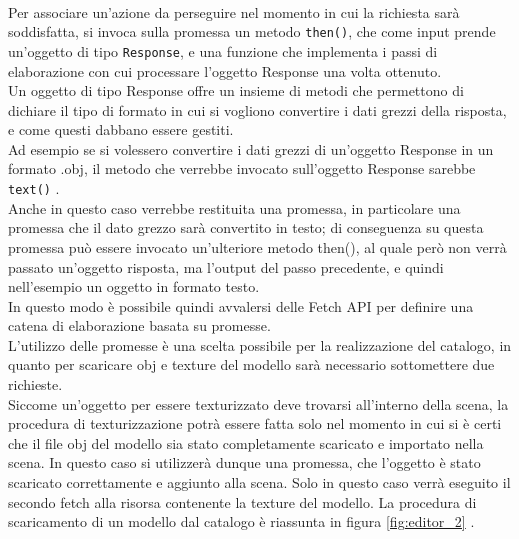 \\ 
Per associare un’azione da perseguire nel momento in cui la richiesta sarà soddisfatta, si invoca sulla promessa un metodo \texttt{then()}, che come input prende un’oggetto di tipo \texttt{Response}, e una funzione che implementa i passi di elaborazione con cui processare l’oggetto Response una volta ottenuto.
\\
Un oggetto di tipo Response offre un insieme di metodi che permettono di dichiare il tipo di formato in cui si vogliono convertire i dati grezzi della risposta, e come questi dabbano essere gestiti.
\\
Ad esempio se si volessero convertire i dati grezzi di un’oggetto Response in un formato .obj, il metodo che verrebbe invocato sull’oggetto Response sarebbe \texttt{text()} . 
\\
Anche in questo caso verrebbe restituita una promessa, in particolare una promessa che il dato grezzo sarà convertito in testo; di conseguenza su questa promessa può essere invocato un’ulteriore metodo then(), al quale però non verrà passato un’oggetto risposta, ma l’output del passo precedente, e quindi nell’esempio un oggetto in formato testo.
\\ 
In questo modo è possibile quindi avvalersi delle Fetch API per definire una catena di elaborazione basata su promesse.
\\  
L’utilizzo delle promesse è una scelta possibile per la realizzazione del catalogo, in quanto per scaricare obj e texture del modello sarà necessario sottomettere due richieste.
\\
Siccome un’oggetto per essere texturizzato deve trovarsi all’interno della scena, la procedura di texturizzazione potrà essere fatta solo nel momento in cui si è certi che il file obj del modello sia stato completamente scaricato e importato nella scena. In questo caso si utilizzerà dunque una promessa, che l’oggetto è stato scaricato correttamente e aggiunto alla scena. Solo in questo caso verrà eseguito il secondo fetch alla risorsa contenente la texture del modello.
La procedura di scaricamento di un modello dal catalogo è riassunta in figura \ref{fig:editor_2} .
\\
